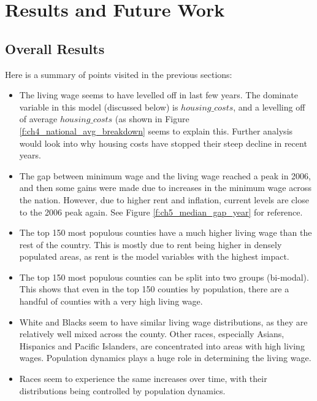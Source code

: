 \chapter{Results and Future Work}\label{ch:results}

\section{Overall Results}

Here is a summary of points visited in the previous sections:

\begin{itemize}
\item The living wage seems to have levelled off in last few years. The dominate variable in this model (discussed below) is $housing\_costs$, and a levelling off of average $housing\_costs$ (as shown in Figure \ref{f:ch4_national_avg_breakdown} seems to explain this. Further analysis would look into why housing costs have stopped their steep decline in recent years.

\item The gap between minimum wage and the living wage reached a peak in 2006, and then some gains were made due to increases in the minimum wage across the nation. However, due to higher rent and inflation, current levels are close to the 2006 peak again. See Figure \ref{f:ch5_median_gap_year} for reference.

\item The top 150 most populous counties have a much higher living wage than the rest of the country. This is mostly due to rent being higher in densely populated areas, as rent is the model variables with the highest impact.

\item The top 150 most populous counties can be split into two groups (bi-modal). This shows that even in the top 150 counties by population, there are a handful of counties with a very high living wage. 

\item White and Blacks seem to have similar living wage distributions, as they are relatively well mixed across the county. Other races, especially Asians, Hispanics and Pacific Islanders, are concentrated into areas with high living wages. Population dynamics plays a huge role in determining the living wage.

\item Races seem to experience the same increases over time, with their distributions being controlled by population dynamics.


\end{itemize}
